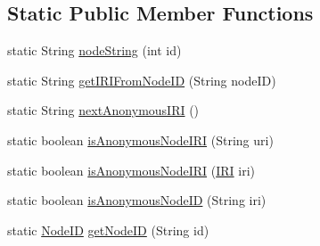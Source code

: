 \subsection*{Static Public Member Functions}
\begin{DoxyCompactItemize}
\item 
static String \hyperlink{classorg_1_1semanticweb_1_1owlapi_1_1model_1_1_node_i_d_acb30739c7d68b320af9d5155fef71009}{node\-String} (int id)
\item 
static String \hyperlink{classorg_1_1semanticweb_1_1owlapi_1_1model_1_1_node_i_d_a4a72f1bb16f29caf4e9cf26d217e4125}{get\-I\-R\-I\-From\-Node\-I\-D} (String node\-I\-D)
\item 
static String \hyperlink{classorg_1_1semanticweb_1_1owlapi_1_1model_1_1_node_i_d_a88590c7be0fe45b98692ed694df1218a}{next\-Anonymous\-I\-R\-I} ()
\item 
static boolean \hyperlink{classorg_1_1semanticweb_1_1owlapi_1_1model_1_1_node_i_d_a662a226e3d7702cc387347174cf207f8}{is\-Anonymous\-Node\-I\-R\-I} (String uri)
\item 
static boolean \hyperlink{classorg_1_1semanticweb_1_1owlapi_1_1model_1_1_node_i_d_a01a4085b91706d4af9b1e2347249c07f}{is\-Anonymous\-Node\-I\-R\-I} (\hyperlink{classorg_1_1semanticweb_1_1owlapi_1_1model_1_1_i_r_i}{I\-R\-I} iri)
\item 
static boolean \hyperlink{classorg_1_1semanticweb_1_1owlapi_1_1model_1_1_node_i_d_a38db5c72f79541b71dd1ffae30b15d62}{is\-Anonymous\-Node\-I\-D} (String iri)
\item 
static \hyperlink{classorg_1_1semanticweb_1_1owlapi_1_1model_1_1_node_i_d}{Node\-I\-D} \hyperlink{classorg_1_1semanticweb_1_1owlapi_1_1model_1_1_node_i_d_a617e9fed1deaeeed5c599ec180d5e74b}{get\-Node\-I\-D} (String id)
\end{DoxyCompactItemize}
